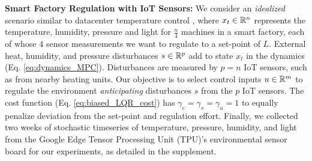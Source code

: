 
\textbf{Smart Factory Regulation with IoT Sensors:}
We consider an \textit{idealized} scenario similar to datacenter temperature control \cite{recht2019tour}, where $x_t \in \mathbb{R}^{n}$ represents the temperature, humidity, pressure and light for $\frac{n}{4}$ machines in a smart factory, each of whose 4 sensor measurements we want to regulate to a set-point of $L$. External heat, humidity, and pressure disturbances $s \in \mathbb{R}^{p}$ add to state $x_t$ in the dynamics (Eq. \ref{eq:dynamics_MPC}). Disturbances are measured by $p=n$ IoT sensors, such as from nearby heating units. Our objective is to select control inputs $u \in \mathbb{R}^{m}$ to regulate the environment \textit{anticipating} disturbances $s$ from the $p$ IoT sensors. The cost function (Eq. \ref{eq:biased_LQR_cost}) has $\gamma_e = \gamma_s = \gamma_u = 1$ to equally penalize deviation from the set-point and regulation effort. Finally, we collected two weeks of stochastic timeseries of temperature, pressure, humidity, and light from the Google Edge Tensor Processing Unit (TPU)'s environmental sensor board for our experiments, as detailed in the supplement.

